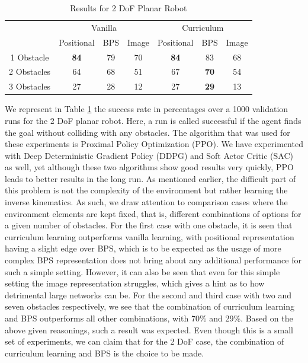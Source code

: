 \documentclass[conference]{IEEEtran}
\begin{document}
\begin{table}[!t]
\renewcommand{\arraystretch}{1.3}
\caption{Results for 2 DoF Planar Robot}
\label{table:1}
\centering
\begin{tabular}{c|ccc|ccc|}
\cline{2-7}
                                  & \multicolumn{3}{c|}{Vanilla}                                       & \multicolumn{3}{c|}{Curriculum}                                    \\ \cline{2-7} 
                                  & \multicolumn{1}{c|}{Positional} & \multicolumn{1}{c|}{BPS} & Image & \multicolumn{1}{c|}{Positional} & \multicolumn{1}{c|}{BPS} & Image \\ \hline
\multicolumn{1}{|c|}{1 Obstacle}  & \multicolumn{1}{c|}{\textbf{84}}          & \multicolumn{1}{c|}{79}   & 70     & \multicolumn{1}{c|}{\textbf{84}}          & \multicolumn{1}{c|}{83}   & 68     \\ \hline
\multicolumn{1}{|c|}{2 Obstacles} & \multicolumn{1}{c|}{64}          & \multicolumn{1}{c|}{68}   & 51     & \multicolumn{1}{c|}{67}          & \multicolumn{1}{c|}{\textbf{70}}   & 54     \\ \hline
\multicolumn{1}{|c|}{3 Obstacles} & \multicolumn{1}{c|}{27}          & \multicolumn{1}{c|}{28}   & 12     & \multicolumn{1}{c|}{27}          & \multicolumn{1}{c|}{\textbf{29}}   & 13     \\ \hline
\end{tabular}
\end{table}



We represent in Table \ref{table:1} the success rate in percentages over a 1000 validation runs for the 2 DoF planar robot. Here, a run is called successful if the agent finds the goal without colliding with any obstacles. The algorithm that was used for these experiments is Proximal Policy Optimization (PPO). We have experimented with Deep Deterministic Gradient Policy (DDPG) and Soft Actor Critic (SAC) as well, yet although these two algorithms show good results very quickly, PPO leads to better results in the long run. As mentioned earlier, the difficult part of this problem is not the complexity of the environment but rather learning the inverse kinematics. As such, we draw attention to comparison cases where the environment elements are kept fixed, that is, different combinations of options for a given number of obstacles. 
For the first case with one obstacle, it is seen that curriculum learning outperforms vanilla learning, with positional representation having a slight edge over BPS, which is to be expected as the usage of more complex BPS representation does not bring about any additional performance for such a simple setting. However, it can also be seen that even for this simple setting the image representation struggles, which gives a hint as to how detrimental large networks can be. 
For the second and third case with two and seven obstacles respectively, we see that the combination of curriculum learning and BPS outperforms all other combinations, with 70\% and 29\%. Based on the above given reasonings, such a result was expected. Even though this is a small set of experiments, we can claim that for the 2 DoF case, the combination of curriculum learning and BPS is the choice to be made. 
\end{document}
